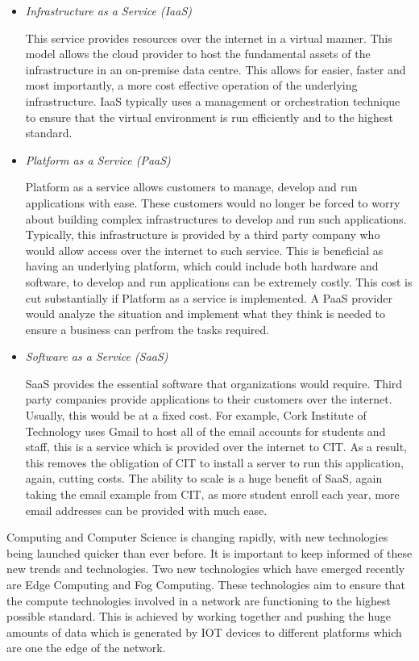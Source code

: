 \begin{itemize}
    \item \textit{Infrastructure as a Service (IaaS)}
    
    This service provides resources over the internet in a virtual manner. This model allows the cloud provider to host the fundamental assets of the infrastructure in an on-premise data centre. This allows for easier, faster and most importantly, a more cost effective operation of the underlying infrastructure. IaaS typically uses a management or orchestration technique to ensure that the virtual environment is run efficiently and to the highest standard.
    
    
    \item \textit{Platform as a Service (PaaS)}
    
    Platform as a service allows customers to manage, develop and run applications with ease. These customers would no longer be forced to worry about building complex infrastructures to develop and run such applications. Typically, this infrastructure is provided by a third party company who would allow access over the internet to such service. This is beneficial as having an underlying platform, which could include both hardware and software, to develop and run applications can be extremely costly. This cost is cut substantially if Platform as a service is implemented. A PaaS provider would analyze the situation and implement what they think is needed to ensure a business can perfrom the tasks required. 
    
    
    \item \textit{Software as a Service (SaaS)}
    
    SaaS provides the essential software that organizations would require. Third party companies provide applications to their customers over the internet. Usually, this would be at a fixed cost. For example, Cork Institute of Technology uses Gmail to host all of the email accounts for students and staff, this is a service which is provided over the internet to CIT. As a result, this removes the obligation of CIT to install a server to run this application, again, cutting costs. The ability to scale is a huge benefit of SaaS, again taking the email example from CIT, as more student enroll each year, more email addresses can be provided with much ease. 
    
\end{itemize}

Computing and Computer Science is changing rapidly, with new technologies being launched quicker than ever before. It is important to keep informed of these new trends and technologies. Two new technologies which have emerged recently are Edge Computing and Fog Computing. These technologies aim to ensure that the compute technologies involved in a network are functioning to the highest possible standard. This is achieved by working together and  pushing the huge amounts of data which is generated by IOT devices to different platforms which are one the edge of the network. 

